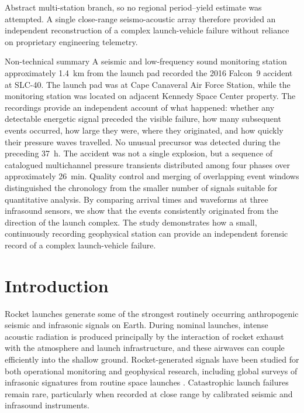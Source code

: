 \documentclass[]{seismica}
\begin{document}
{\begin{summary}{Abstract}
  multi-station branch, so no regional period--yield estimate was attempted.
  A single close-range seismo-acoustic array therefore provided an independent
  reconstruction of a complex launch-vehicle failure without reliance on
  proprietary engineering telemetry.
  \end{summary}
  \begin{summary}{Non-technical summary}
  A seismic and low-frequency sound monitoring station approximately
  \SI{1.4}{\kilo\metre} from the launch pad recorded the 2016 Falcon~9
  accident at SLC-40. The launch pad was at Cape Canaveral Air Force Station,
  while the monitoring station was located on adjacent Kennedy Space Center
  property. The recordings provide an independent account of what happened:
  whether any detectable energetic signal preceded the visible failure, how
  many subsequent events occurred, how large they were, where they originated,
  and how quickly their pressure waves travelled. No unusual precursor was
  detected during the preceding \SI{37}{\hour}. The accident was not a single
  explosion, but a sequence of catalogued multichannel pressure transients
  distributed among four phases over approximately \SI{26}{\minute}.
  Quality control and merging of overlapping event windows distinguished the
  chronology from the smaller number of signals suitable for quantitative
  analysis. By comparing arrival times and waveforms at
  three infrasound sensors, we show that the events consistently originated
  from the direction of the launch complex. The study demonstrates how a
  small, continuously recording geophysical station can provide an independent
  forensic record of a complex launch-vehicle failure.
  \end{summary}
}


\section{Introduction}
\label{sec:introduction}

Rocket launches generate some of the strongest routinely occurring
anthropogenic seismic and infrasonic signals on Earth. During nominal launches,
intense acoustic radiation is produced principally by the interaction of rocket
exhaust with the atmosphere and launch infrastructure, and these airwaves can
couple efficiently into the shallow ground. Rocket-generated signals have been
studied for both operational monitoring and geophysical research, including
global surveys of infrasonic signatures from routine space launches
\citep{pilger_rocket_2021}. Catastrophic launch failures remain rare,
particularly when recorded at close range by calibrated seismic and infrasound
instruments.
\end{document}
